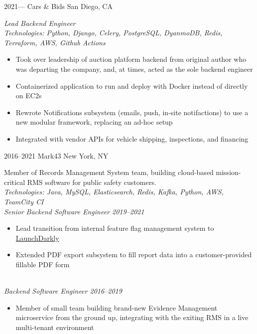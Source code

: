 \documentclass[]{friggeri-mlg-cv} %
\begin{document}
\begin{entrylist}
\entry
{2021---}
{Cars \& Bids}
{San Diego, CA}
{\emph{Lead Backend Engineer}\\
\emph{Technologies: Python, Django, Celery, PostgreSQL, DyanmoDB, Redis, Terraform, AWS, Github Actions}
\begin{itemize}[leftmargin=*]
\item Took over leadership of auction platform backend from original author who was
departing the company, and, at times, acted as the sole backend engineer
\item Containerized application to run and deploy with Docker instead of directly on EC2s
\item Rewrote Notifications subsystem (emails, push, in-site notifactions) to use
a new modular framework, replacing an ad-hoc setup
\item Integrated with vendor APIs for vehicle shipping, inspections, and financing
\end{itemize}
}
\entry
{2016--2021}
{Mark43}
{New York, NY}
{Member of Records Management System team, building cloud-based mission-critical 
RMS software for public safety customers.\\
\emph{Technologies: Java, MySQL, Elasticsearch, Redis, Kafka, Python, AWS, TeamCity CI}\\
\emph{Senior Backend Software Engineer 2019--2021}
\begin{itemize}[leftmargin=*]
\item Lead transition from internal feature flag management system to 
\href{https://launchdarkly.com}{LaunchDarkly}
\item Extended PDF export subsystem to fill report data into a customer-provided
fillable PDF form
\end{itemize}
\quad\\
\emph{Backend Software Engineer 2016--2019}
\begin{itemize}[leftmargin=*]
\item Member of small team building brand-new Evidence Management microservice from the 
ground up, integrating with the exiting RMS in a live multi-tenant environment

\end{itemize}}
\end{entrylist}
\end{document}
